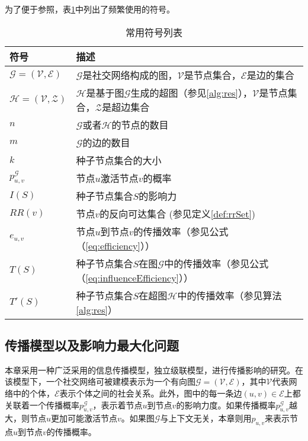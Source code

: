 为了便于参照，表\ref{tab:notation}中列出了频繁使用的符号。

\begin{table}[ht]
\centering
\caption{常用符号列表}
\begin{tabular}{|p{2cm}|p{10cm}|}
\hline
\textbf{符号} & \textbf{描述} \\
\hline
$\mathcal{G}=\left(\mathcal{V},\mathcal{E}\right)$ & $\mathcal{G}$是社交网络构成的图，$\mathcal{V}$是节点集合，$\mathcal{E}$是边的集合\\
\hline
$\mathcal{H}=\left(\mathcal{V},\mathcal{Z}\right)$ & $\mathcal{H}$是基于图$\mathcal{G}$生成的超图（参见\ref{alg:res}），$\mathcal{V}$是节点集合，$\mathcal{Z}$是超边集合\\
\hline
$n$ & $\mathcal{G}$或者$\mathcal{H}$的节点的数目 \\
\hline
$m$ & $\mathcal{G}$的边的数目 \\
\hline
$k$ & 种子节点集合的大小 \\
\hline
$p^\mathcal{G}_{u,v}$ & 节点$u$激活节点$v$的概率 \\
\hline
$I\left(S\right)$ & 种子节点集合$S$的影响力 \\
\hline
$RR\left(v\right)$ & 节点$v$的反向可达集合 (参见定义\ref{def:rrSet}) \\
\hline
$e_{u,v}$ & 节点$u$到节点$v$的传播效率（参见公式（\ref{eq:efficiency}）） \\
\hline
$T\left(S\right)$ & 种子节点集合$S$在图$\mathcal{G}$中的传播效率（参见公式（\ref{eq:influenceEfficiency}））\\
\hline
$T'\left(S\right)$ & 种子节点集合$S$在超图$\mathcal{H}$中的传播效率（参见算法\ref{alg:res}）\\
\hline
\end{tabular}
\label{tab:notation}
\end{table}

\subsection{传播模型以及影响力最大化问题}
\label{subsec4:model}
本章采用一种广泛采用的信息传播模型，独立级联模型，进行传播影响的研究。在该模型下，一个社交网络可被建模表示为一个有向图$\mathcal{G}=\left(\mathcal{V},\mathcal{E}\right)$，其中$\mathcal{V}$代表网络中的个体，$\mathcal{E}$表示个体之间的社会关系。此外，图中的每一条边$\left(u, v\right) \in \mathcal{E}$上都关联着一个传播概率$p^\mathcal{G}_{u,v}$，表示着节点$u$到节点$v$的影响力度。如果传播概率$p^\mathcal{G}_{u,v}$越大，则节点$u$更加可能激活节点$v$。如果图$\mathcal{G}$与上下文无关，本章则用$p_{u,v}$来表示节点$u$到节点$v$的传播概率。

